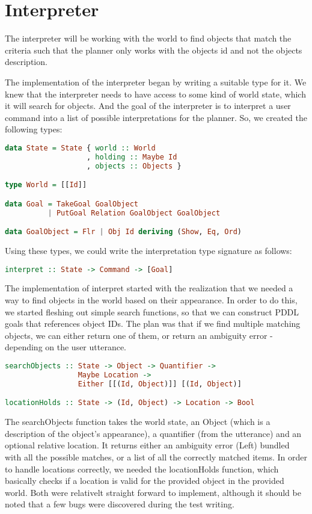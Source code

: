 \section*{Interpreter}
The interpreter will be working with the world to find objects that match the
criteria such that the planner only works with the objects id and not the
objects description.

The implementation of the interpreter began by writing a suitable type for it. We knew that the interpreter needs to have access to some kind of world state, which it will search for objects. And the goal of the interpreter is to interpret a user command into a list of possible interpretations for the planner. So, we created the following types:

\begin{lstlisting}[language=haskell]
data State = State { world :: World
                   , holding :: Maybe Id
                   , objects :: Objects }

type World = [[Id]]

data Goal = TakeGoal GoalObject
          | PutGoal Relation GoalObject GoalObject

data GoalObject = Flr | Obj Id deriving (Show, Eq, Ord)
\end{lstlisting}
Using these types, we could write the interpretation type signature as follows:

\begin{lstlisting}[language=haskell]
interpret :: State -> Command -> [Goal]
\end{lstlisting}

The implementation of interpret started with the realization that we needed a way to find objects in the world based on their appearance. In order to do this, we started fleshing out simple search functions, so that we can construct PDDL goals that references object IDs. The plan was that if we find multiple matching objects, we can either return one of them, or return an ambiguity error - depending on the user utterance.

\begin{lstlisting}[language=haskell]
searchObjects :: State -> Object -> Quantifier ->
                 Maybe Location ->
                 Either [[(Id, Object)]] [(Id, Object)]

locationHolds :: State -> (Id, Object) -> Location -> Bool
\end{lstlisting}

The searchObjects function takes the world state, an Object (which is a description of the object's appearance), a quantifier (from the utterance) and an optional relative location. It returns either an ambiguity error (Left) bundled with all the possible matches, or a list of all the correctly matched items. In order to handle locations correctly, we needed the locationHolds function, which basically checks if a location is valid for the provided object in the provided world. Both were relativelt straight forward to implement, although it should be noted that a few bugs were discovered during the test writing.
